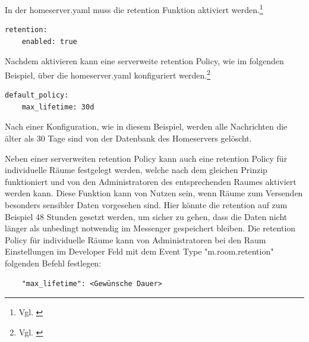 In der homeserver.yaml muss die retention Funktion aktiviert werden.\footnote{Vgl. \cite{Matrix.org-retentio-policies2020}}

\begin{lstlisting}
retention:
    enabled: true
\end{lstlisting}

Nachdem aktivieren kann eine serverweite retention Policy, wie im folgenden Beispiel, über die homeserver.yaml konfiguriert werden.\footnote{Vgl. \cite{Matrix.org-retentio-policies2020}}

\begin{lstlisting}
default_policy:
    max_lifetime: 30d
\end{lstlisting}

Nach einer Konfiguration, wie in diesem Beispiel, werden alle Nachrichten die älter als 30 Tage sind von der Datenbank des Homeservers gelöscht.

Neben einer serverweiten retention Policy kann auch eine retention Policy für individuelle Räume festgelegt werden, welche nach dem gleichen Prinzip funktioniert und von den Administratoren des entsprechenden Raumes aktiviert werden kann. Diese Funktion kann von Nutzen sein, wenn Räume zum Versenden besonders sensibler Daten vorgesehen sind. Hier könnte die retention auf zum Beispiel 48 Stunden gesetzt werden, um sicher zu gehen, dass die Daten nicht länger als unbedingt notwendig im Messenger gespeichert bleiben. Die retention Policy für individuelle Räume kann von Administratoren bei den Raum Einstellungen im Developer Feld mit dem Event Type "m.room.retention" folgenden Befehl festlegen:

\begin{lstlisting}
    "max_lifetime": <Gewünsche Dauer>
\end{lstlisting}

